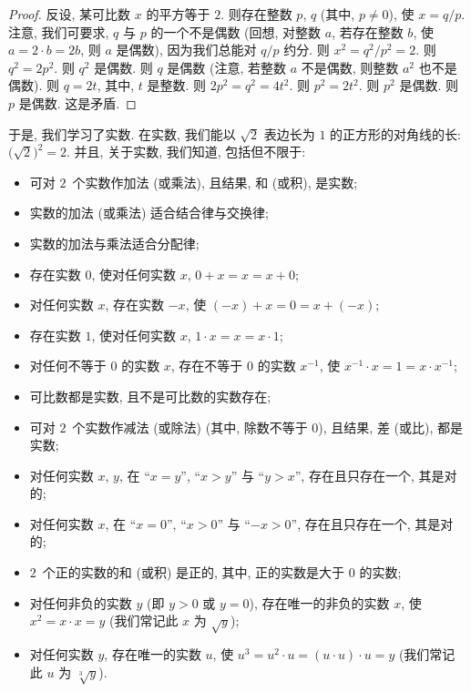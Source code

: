 \documentclass[../libro.tex]{subfiles}
\begin{document}
\begin{proof}
    反设, 某可比数 \(x\) 的平方等于 \(2\).
    则存在整数 \(p\), \(q\) (其中, \(p \neq 0\)),
    使 \(x = q/p\).
    注意, 我们可要求, \(q\) 与 \(p\) 的一个不是偶数
    (回想, 对整数 \(a\), 若存在整数 \(b\), %
    使 \(a = 2 \cdot b = 2b\),
    则 \(a\) 是偶数), %
    因为我们总能对 \(q/p\) 约分.
    则 \(x^2 = q^2 / p^2 = 2\).
    则 \(q^2 = 2 p^2\).
    则 \(q^2\) 是偶数.
    则 \(q\) 是偶数
    (注意, 若整数 \(a\) 不是偶数,
    则整数 \(a^2\) 也不是偶数).
    则 \(q = 2t\), 其中, \(t\) 是整数.
    则 \(2 p^2 = q^2 = 4 t^2\).
    则 \(p^2 = 2 t^2\).
    则 \(p^2\) 是偶数.
    则 \(p\) 是偶数.
    这是矛盾.
\end{proof}

于是, 我们学习了实数.
在实数, 我们能以 \(\sqrt{2}\)
表边长为 \(1\) 的正方形的对角线的长:
\(\big(\sqrt{2}\big)^2 = 2\).
并且, 关于实数, 我们知道, 包括但不限于:
\begin{itemize}
    \item 可对 \(2\)~个实数作加法 (或乘法),
        且结果, 和 (或积), 是实数;
    \item 实数的加法 (或乘法) 适合结合律与交换律;
    \item 实数的加法与乘法适合分配律;
    \item 存在实数 \(0\), 使对任何实数 \(x\),
        \(0 + x = x = x + 0\);
    \item 对任何实数 \(x\), 存在实数 \(-x\),
        使 \((-x) + x = 0 = x + (-x)\);
    \item 存在实数 \(1\), 使对任何实数 \(x\),
        \(1 \cdot x = x = x \cdot 1\);
    \item 对任何不等于 \(0\) 的实数 \(x\),
        存在不等于 \(0\) 的实数 \(x^{-1}\),
        使 \(x^{-1} \cdot x = 1 = x \cdot x^{-1}\);
    \item 可比数都是实数, 且不是可比数的实数存在;
    \item 可对 \(2\)~个实数作减法 (或除法)
        (其中, 除数不等于 \(0\)),
        且结果, 差 (或比), 都是实数;
    \item 对任何实数 \(x\), \(y\),
        在 ``\(x = y\)'',
        ``\(x > y\)''
        与 ``\(y > x\)'',
        存在且只存在一个, 其是对的;
    \item 对任何实数 \(x\),
        在 ``\(x = 0\)'',
        ``\(x > 0\)''
        与 ``\(-x > 0\)'',
        存在且只存在一个, 其是对的;
    \item \(2\)~个正的实数的和 (或积) 是正的,
        其中, 正的实数是大于 \(0\) 的实数;
    \item 对任何非负的实数 \(y\)
        (即 \(y > 0\) 或 \(y = 0\)),
        存在唯一的非负的实数 \(x\),
        使 \(x^2 = x \cdot x = y\)
        (我们常记此 \(x\) 为 \(\sqrt{y}\));
    \item 对任何实数 \(y\),
        存在唯一的实数 \(u\),
        使 \(u^3 = u^2 \cdot u
        = (u \cdot u) \cdot u = y\)
        (我们常记此 \(u\) 为 \(\sqrt[3]{y}\)).
\end{itemize}
\end{document}
